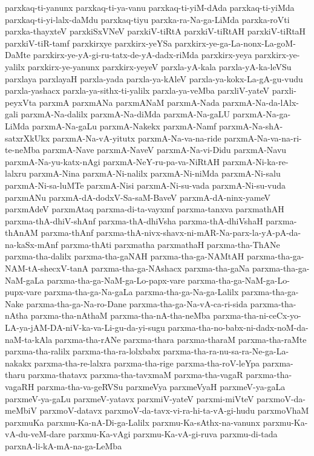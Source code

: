 {parxkaq-ti-yanunx
parxkaq-ti-ya-vanu
parxkaq-ti-yiM-dAda
parxkaq-ti-yiMda
parxkaq-ti-yi-lalx-daMdu
parxkaq-tiyu
parxka-ra-Na-ga-LiMda
parxka-roVti
parxka-thayxteV
parxkiSxVNeV
parxkiV-tiRtA
parxkiV-tiRtAH
parxkiV-tiRtaH
parxkiV-tiR-tamf
parxkirxye
parxkirx-yeYSa
parxkirx-ye-ga-La-nonx-La-goM-DaMte
parxkirx-ye-yA-gi-ru-tatx-de-yA-dadx-riMda
parxkirx-yeya
parxkirx-ye-yalilx
parxkirx-ye-yanunx
parxkirx-yeyeV
parxla-yA-kala
parxla-yA-ka-leVSu
parxlaya
parxlayaH
parxla-yada
parxla-ya-kAleV
parxla-ya-kokx-La-gA-gu-vudu
parxla-yashacx
parxla-ya-sithx-ti-yalilx
parxla-ya-veMba
parxliV-yateV
parxli-peyxVta
parxmA
parxmANa
parxmANaM
parxmA-Nada
parxmA-Na-da-lAlx-gali
parxmA-Na-dalilx
parxmA-Na-diMda
parxmA-Na-gaLU
parxmA-Na-ga-LiMda
parxmA-Na-gaLu
parxmA-Nakekx
parxmA-Namf
parxmA-Na-shA-satxrXkUkx
parxmA-Na-vA-yitutx
parxmA-Na-va-na-ride
parxmA-Na-va-na-ri-te-neMba
parxmA-Nave
parxmA-NaveV
parxmA-Na-vi-Didu
parxmA-Navu
parxmA-Na-yu-katx-nAgi
parxmA-NeY-ru-pa-va-NiRtAH
parxmA-Ni-ka-re-lalxru
parxmA-Nina
parxmA-Ni-nalilx
parxmA-Ni-niMda
parxmA-Ni-salu
parxmA-Ni-sa-luMTe
parxmA-Nisi
parxmA-Ni-su-vada
parxmA-Ni-su-vuda
parxmANu
parxmA-dA-dodxV-Sa-saM-BaveV
parxmA-dA-ninx-yameV
parxmAdeV
parxmAtaq
parxma-di-ta-vayxmf
parxma-tanxva
parxmathAH
parxma-thA-dhiV-shAnf
parxma-thA-dhiVsha
parxma-thA-dhiVshaH
parxma-thAnAM
parxma-thAnf
parxma-thA-nivx-shavx-ni-mAR-Na-parx-la-yA-pA-da-na-kaSx-mAnf
parxma-thAti
parxmatha
parxmathaH
parxma-tha-ThANe
parxma-tha-dalilx
parxma-tha-gaNAH
parxma-tha-ga-NAMtAH
parxma-tha-ga-NAM-tA-shecxV-tanA
parxma-tha-ga-NAshacx
parxma-tha-gaNa
parxma-tha-ga-NaM-gaLa
parxma-tha-ga-NaM-ga-Lo-papx-vare
parxma-tha-ga-NaM-ga-Lo-pupx-vare
parxma-tha-ga-Na-gaLa
parxma-tha-ga-Na-ga-Lalilx
parxma-tha-ga-Nake
parxma-tha-ga-Na-ro-Dane
parxma-tha-ga-Na-vA-ca-ri-sida
parxma-tha-nAtha
parxma-tha-nAthaM
parxma-tha-nA-tha-neMba
parxma-tha-ni-ceCx-yo-LA-ya-jAM-DA-niV-ka-va-Li-gu-da-yi-sugu
parxma-tha-no-babx-ni-dadx-noM-da-naM-ta-kAla
parxma-tha-rANe
parxma-thara
parxma-tharaM
parxma-tha-raMte
parxma-tha-ralilx
parxma-tha-ra-lolxbabx
parxma-tha-ra-nu-sa-ra-Ne-ga-La-nakakx
parxma-tha-re-lalxra
parxma-tha-rige
parxma-tha-roV-leYpa
parxma-tharu
parxma-thatavx
parxma-tha-tavxmaM
parxma-tha-vagaR
parxma-tha-vagaRH
parxma-tha-va-geRVSu
parxmeVya
parxmeVyaH
parxmeV-ya-gaLa
parxmeV-ya-gaLu
parxmeV-yatavx
parxmiV-yateV
parxmi-miVteV
parxmoV-da-meMbiV
parxmoV-datavx
parxmoV-da-tavx-vi-ra-hi-ta-vA-gi-hudu
parxmoVhaM
parxmuKa
parxmu-Ka-nA-Di-ga-Lalilx
parxmu-Ka-sAthx-na-vanunx
parxmu-Ka-vA-du-veM-dare
parxmu-Ka-vAgi
parxmu-Ka-vA-gi-ruva
parxmu-di-tada
parxnA-li-kA-mA-na-ga-LeMba
}
